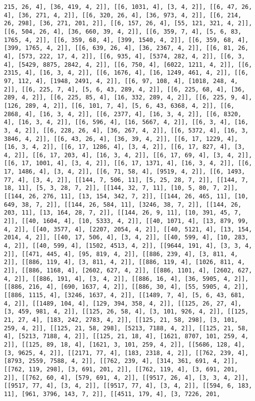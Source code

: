 \documentclass[12pt,fleqn]{article}\usepackage{../../common}
\begin{document}
\begin{verbatim}
215, 26, 4], [36, 419, 4, 2]], [[6, 1031, 4], [3, 4, 2]], [[6, 47, 26, 4], [36, 271, 4, 2]], [[6, 320, 26, 4], [36, 973, 4, 2]], [[6, 214, 26, 298], [36, 271, 201, 2]], [[6, 157, 26, 4], [55, 121, 321, 4, 2]], [[6, 504, 26, 4], [36, 660, 39, 4, 2]], [[6, 359, 7, 4], [5, 6, 83, 1765, 4, 2]], [[6, 359, 68, 4], [399, 1540, 4, 2]], [[6, 359, 68, 4], [399, 1765, 4, 2]], [[6, 639, 26, 4], [36, 2367, 4, 2]], [[6, 81, 26, 4], [573, 222, 17, 4, 2]], [[6, 935, 4], [5374, 282, 4, 2]], [[6, 3, 4], [5429, 8875, 2842, 4, 2]], [[6, 750, 4], [6022, 1211, 4, 2]], [[6, 2315, 4], [16, 3, 4, 2]], [[6, 1676, 4], [16, 1249, 461, 4, 2]], [[6, 97, 112, 4], [1948, 2491, 4, 2]], [[6, 97, 108, 4], [1018, 248, 4, 2]], [[6, 225, 7, 4], [5, 6, 43, 289, 4, 2]], [[6, 225, 68, 4], [36, 289, 4, 2]], [[6, 225, 85, 4], [16, 332, 289, 4, 2]], [[6, 225, 9, 4], [126, 289, 4, 2]], [[6, 101, 7, 4], [5, 6, 43, 6368, 4, 2]], [[6, 2868, 4], [16, 3, 4, 2]], [[6, 2377, 4], [16, 3, 4, 2]], [[6, 8320, 4], [16, 3, 4, 2]], [[6, 596, 4], [16, 5667, 4, 2]], [[6, 3, 4], [16, 3, 4, 2]], [[6, 228, 26, 4], [36, 267, 4, 2]], [[6, 5372, 4], [16, 3, 3846, 4, 2]], [[6, 43, 26, 4], [36, 39, 4, 2]], [[6, 17, 1229, 4], [16, 3, 4, 2]], [[6, 17, 1286, 4], [3, 4, 2]], [[6, 17, 827, 4], [3, 4, 2]], [[6, 17, 203, 4], [16, 3, 4, 2]], [[6, 17, 69, 4], [3, 4, 2]], [[6, 17, 1001, 4], [3, 4, 2]], [[6, 17, 1371, 4], [16, 3, 4, 2]], [[6, 17, 1486, 4], [3, 4, 2]], [[6, 71, 58, 4], [9519, 4, 2]], [[6, 1493, 77, 4], [3, 4, 2]], [[144, 7, 506, 11], [5, 25, 28, 7, 2]], [[144, 7, 18, 11], [5, 3, 28, 7, 2]], [[144, 32, 7, 11], [10, 5, 80, 7, 2]], [[144, 26, 276, 11], [13, 154, 342, 7, 2]], [[144, 26, 465, 11], [10, 649, 38, 7, 2]], [[144, 26, 584, 11], [3246, 38, 7, 2]], [[144, 26, 203, 11], [13, 164, 28, 7, 2]], [[144, 26, 9, 11], [10, 391, 45, 7, 2]], [[40, 1604, 4], [10, 5333, 4, 2]], [[40, 1071, 4], [13, 879, 99, 4, 2]], [[40, 3577, 4], [2207, 2054, 4, 2]], [[40, 5121, 4], [13, 154, 2014, 4, 2]], [[40, 17, 506, 4], [3, 4, 2]], [[40, 599, 4], [10, 283, 4, 2]], [[40, 599, 4], [1502, 4513, 4, 2]], [[9644, 191, 4], [3, 3, 4, 2]], [[471, 445, 4], [95, 819, 4, 2]], [[886, 239, 4], [3, 811, 4, 2]], [[886, 119, 4], [3, 811, 4, 2]], [[886, 119, 4], [1026, 811, 4, 2]], [[886, 1168, 4], [2602, 627, 4, 2]], [[886, 1101, 4], [2602, 627, 4, 2]], [[886, 191, 4], [3, 4, 2]], [[886, 16, 4], [36, 5905, 4, 2]], [[886, 216, 4], [690, 1637, 4, 2]], [[886, 30, 4], [55, 5905, 4, 2]], [[886, 1115, 4], [3246, 1637, 4, 2]], [[1489, 7, 4], [5, 6, 43, 681, 4, 2]], [[1489, 104, 4], [129, 394, 358, 4, 2]], [[125, 26, 27, 4], [3, 459, 981, 4, 2]], [[125, 26, 58, 4], [3, 101, 926, 4, 2]], [[125, 21, 27, 4], [183, 242, 2783, 4, 2]], [[125, 21, 58, 298], [3, 101, 259, 4, 2]], [[125, 21, 58, 298], [5213, 7188, 4, 2]], [[125, 21, 58, 4], [5213, 7188, 4, 2]], [[125, 21, 18, 4], [1621, 8707, 101, 259, 4, 2]], [[125, 89, 18, 4], [1621, 3, 101, 259, 4, 2]], [[5686, 128, 4], [3, 9625, 4, 2]], [[2171, 77, 4], [183, 2318, 4, 2]], [[762, 239, 4], [8793, 2559, 7588, 4, 2]], [[762, 239, 4], [314, 361, 691, 4, 2]], [[762, 119, 298], [3, 691, 201, 2]], [[762, 119, 4], [3, 691, 201, 2]], [[762, 60, 4], [579, 691, 4, 2]], [[9517, 26, 4], [3, 3, 4, 2]], [[9517, 77, 4], [3, 4, 2]], [[9517, 77, 4], [3, 4, 2]], [[594, 6, 183, 11], [961, 3796, 143, 7, 2]], [[4511, 179, 4], [3, 7226, 201, 
\end{verbatim}
\end{document}
